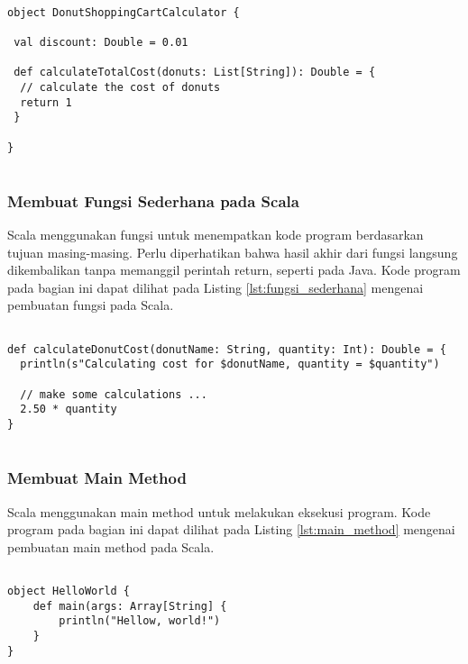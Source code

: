 \begin{lstlisting}[basicstyle=\ttfamily, frame=single,
	columns=fullflexible, keepspaces=true, breaklines=true, label=lst:kelas_object, caption=Membuat Kelas Object pada Scala]
	
object DonutShoppingCartCalculator {

 val discount: Double = 0.01

 def calculateTotalCost(donuts: List[String]): Double = {
  // calculate the cost of donuts
  return 1
 }
 
}
	
\end{lstlisting}

\newpage
\subsubsection{Membuat Fungsi Sederhana pada Scala}
Scala menggunakan fungsi untuk menempatkan kode program berdasarkan tujuan masing-masing. Perlu diperhatikan bahwa hasil akhir dari fungsi langsung dikembalikan tanpa memanggil perintah return, seperti pada Java. Kode program pada bagian ini dapat dilihat pada Listing \ref{lst:fungsi_sederhana} mengenai pembuatan fungsi pada Scala.

\begin{lstlisting}[basicstyle=\ttfamily, frame=single,
	columns=fullflexible, keepspaces=true, breaklines=true, label=lst:fungsi_sederhana, caption=Membuat Fungsi Sedehana pada Scala]
	
def calculateDonutCost(donutName: String, quantity: Int): Double = {
  println(s"Calculating cost for $donutName, quantity = $quantity")

  // make some calculations ...
  2.50 * quantity
}
	
\end{lstlisting}


\subsubsection{Membuat Main Method}
Scala menggunakan main method untuk melakukan eksekusi program. Kode program pada bagian ini dapat dilihat pada Listing \ref{lst:main_method} mengenai pembuatan main method pada Scala.

\begin{lstlisting}[basicstyle=\ttfamily, frame=single,
	columns=fullflexible, keepspaces=true, breaklines=true, label=lst:main_method, caption=Membuat Main Method pada Scala]
	
object HelloWorld {
	def main(args: Array[String] {
		println("Hellow, world!")
	}
}
	
\end{lstlisting}

